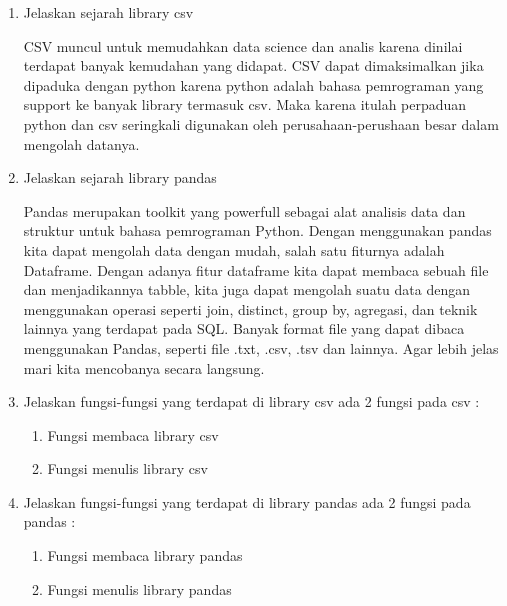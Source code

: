\begin{enumerate}
	\item Jelaskan sejarah library csv
	
	CSV muncul untuk memudahkan data science dan analis karena dinilai terdapat banyak kemudahan yang didapat. CSV dapat dimaksimalkan jika dipaduka dengan python karena python adalah bahasa pemrograman yang support ke banyak library termasuk csv. Maka karena itulah perpaduan python dan csv seringkali digunakan oleh perusahaan-perushaan besar dalam mengolah datanya.
	
	\item Jelaskan sejarah library pandas

	Pandas merupakan toolkit yang powerfull sebagai alat analisis data dan struktur untuk bahasa pemrograman Python. Dengan menggunakan pandas kita dapat mengolah data dengan mudah, salah satu fiturnya adalah Dataframe. Dengan adanya fitur dataframe kita dapat membaca sebuah file dan menjadikannya tabble, kita juga dapat mengolah suatu data dengan menggunakan operasi seperti join, distinct, group by, agregasi, dan teknik lainnya yang terdapat pada SQL. Banyak format file yang dapat dibaca menggunakan Pandas, seperti file .txt, .csv, .tsv dan lainnya. Agar lebih jelas mari kita mencobanya secara langsung.
	
	\item Jelaskan fungsi-fungsi yang terdapat di library csv
	ada 2 fungsi pada csv :
	\begin{enumerate}
	\item Fungsi membaca library csv
		
	
		
	\item Fungsi menulis library csv
		
	
	\end{enumerate}

	\item Jelaskan fungsi-fungsi yang terdapat di library pandas
			ada 2 fungsi pada pandas :
	\begin{enumerate}
	\item Fungsi membaca library pandas
		
	
		
	\item Fungsi menulis library pandas
		
	
	\end{enumerate}
		
\end{enumerate}   



